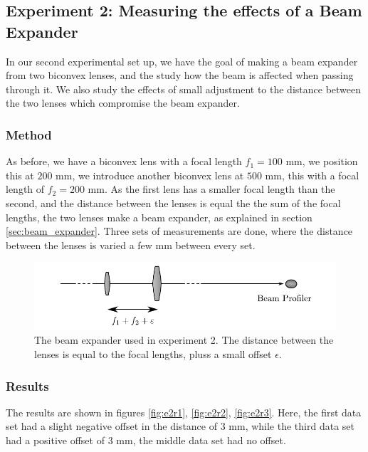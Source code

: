 \documentclass[a4paper, 11pt, notitlepage, english]{article}
\newcommand{\eps}{\epsilon}
\begin{document}
\clearpage

\subsection{Experiment 2: Measuring the effects of a Beam Expander}

In our second experimental set up, we have the goal of making a beam expander from two biconvex lenses, and the study how the beam is affected when passing through it. We also study the effects of small adjustment to the distance between the two lenses which compromise the beam expander.

\subsubsection{Method}

As before, we have a biconvex lens with a focal length $f_1 = 100$ mm, we position this at $200$ mm, we introduce another biconvex lens at $500$ mm, this with a focal length of $f_2=200$ mm. As the first lens has a smaller focal length than the second, and the distance between the lenses is equal the the sum of the focal lengths, the two lenses make a beam expander, as explained in section \ref{sec:beam_expander}. Three sets of measurements are done, where the distance between the lenses is varied a few mm between every set.

\begin{figure}[ht]
\centering
\includegraphics[width=\textwidth]{oppsett2}	
\caption{The beam expander used in experiment 2. The distance between the lenses is equal to the focal lengths, pluss a small offset $\eps$. \label{fig:e2}}
\end{figure}

\subsubsection{Results}

The results are shown in figures \ref{fig:e2r1}, \ref{fig:e2r2}, \ref{fig:e2r3}. Here, the first data set had a slight negative offset in the distance of 3 mm, while the third data set had a positive offset of 3 mm, the middle data set had no offset.
\end{document}
